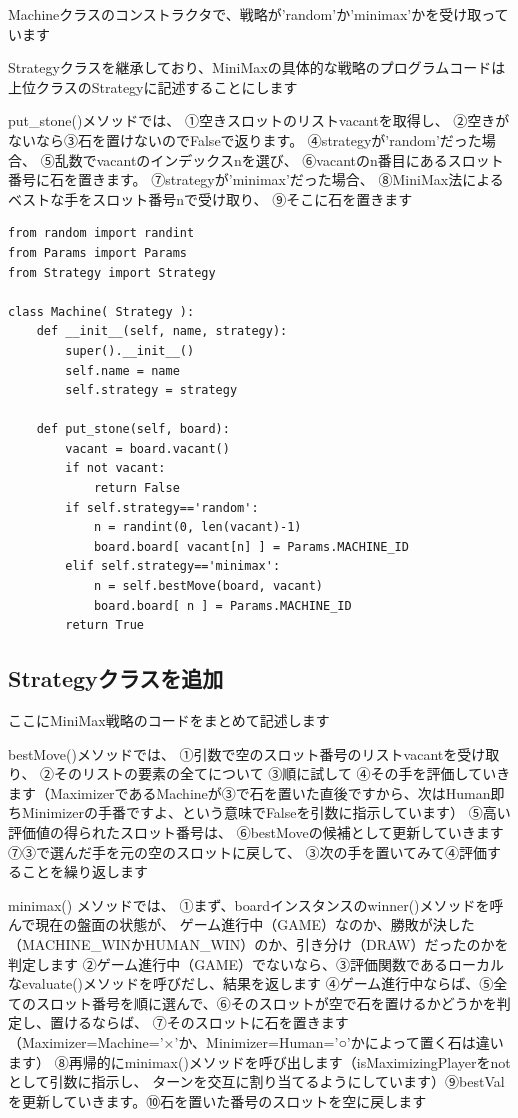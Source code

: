 \documentclass[uplatex,a4paper,11pt,oneside,openany]{jsbook}
\begin{document}
Machineクラスのコンストラクタで、戦略が'random'か'minimax'かを受け取っています

Strategyクラスを継承しており、MiniMaxの具体的な戦略のプログラムコードは
上位クラスのStrategyに記述することにします

put\_stone()メソッドでは、
①空きスロットのリストvacantを取得し、
②空きがないなら③石を置けないのでFalseで返ります。
④strategyが'random'だった場合、
⑤乱数でvacantのインデックスnを選び、
⑥vacantのn番目にあるスロット番号に石を置きます。
⑦strategyが'minimax'だった場合、
⑧MiniMax法によるベストな手をスロット番号nで受け取り、
⑨そこに石を置きます

\begin{lstlisting}[caption=Machine.py,label=minimax06]
from random import randint
from Params import Params
from Strategy import Strategy

class Machine( Strategy ):
    def __init__(self, name, strategy):
        super().__init__()
        self.name = name
        self.strategy = strategy

    def put_stone(self, board):
        vacant = board.vacant()
        if not vacant:
            return False
        if self.strategy=='random':
            n = randint(0, len(vacant)-1)
            board.board[ vacant[n] ] = Params.MACHINE_ID
        elif self.strategy=='minimax':
            n = self.bestMove(board, vacant)
            board.board[ n ] = Params.MACHINE_ID
        return True
\end{lstlisting}

\subsection{Strategyクラスを追加}

ここにMiniMax戦略のコードをまとめて記述します

bestMove()メソッドでは、
①引数で空のスロット番号のリストvacantを受け取り、
②そのリストの要素の全てについて
③順に試して
④その手を評価していきます（MaximizerであるMachineが③で石を置いた直後ですから、次はHuman即ちMinimizerの手番ですよ、という意味でFalseを引数に指示しています）
⑤高い評価値の得られたスロット番号は、
⑥bestMoveの候補として更新していきます
⑦③で選んだ手を元の空のスロットに戻して、
③次の手を置いてみて④評価することを繰り返します

minimax() メソッドでは、
①まず、boardインスタンスのwinner()メソッドを呼んで現在の盤面の状態が、
ゲーム進行中（GAME）なのか、勝敗が決した（MACHINE\_WINかHUMAN\_WIN）のか、引き分け（DRAW）だったのかを判定します
②ゲーム進行中（GAME）でないなら、③評価関数であるローカルなevaluate()メソッドを呼びだし、結果を返します
④ゲーム進行中ならば、⑤全てのスロット番号を順に選んで、⑥そのスロットが空で石を置けるかどうかを判定し、置けるならば、
⑦そのスロットに石を置きます（Maximizer=Machine='×'か、Minimizer=Human='○'かによって置く石は違います）
⑧再帰的にminimax()メソッドを呼び出します（isMaximizingPlayerをnotとして引数に指示し、
ターンを交互に割り当てるようにしています）⑨bestValを更新していきます。⑩石を置いた番号のスロットを空に戻します
\end{document}

